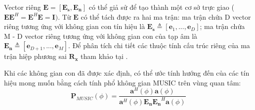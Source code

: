 Vector riêng $\mathbf{E} = [\mathbf{E}_{\mathbf{s}}, \mathbf{E}_{\mathbf{n}}]$ có thể giả sử để tạo thành một cơ sở trực giao ($\mathbf{E}\mathbf{E}^{H} = \mathbf{E}^{H}\mathbf{E} = \mathbf{I})$. Từ $\mathbf{E}$ có thể tách được ra hai ma trận: ma trận chứa D vector riêng tương ứng với không gian con tín hiệu là $\mathbf{E}_{\mathbf{s}} \triangleq [\mathbf{e}_{1}, ..., \mathbf{e}_{D}]$; ma trận chứa M - D vector riêng tương ứng với không gian con của tạp âm là $\mathbf{E}_{\mathbf{n}} \triangleq [\mathbf{e}_{D+1}, ..., \mathbf{e}_{M}]$. Để phân tích chi tiết các thuộc tính cấu trúc riêng của ma trận hiệp phương sai $\mathbf{R}_{\mathbf{x}}$ tham khảo tại \cite{Schmidt2009a}.


Khi các không gian con đã được xác định, có thể ước tính hướng đến của các tín hiệu mong muốn bằng cách tính phổ không gian MUSIC trên vùng quan tâm:
\begin{equation}
	\mathbf{P}_{MUSIC}(\phi) = \frac{\mathbf{a}^{H}(\phi)\mathbf{a}(\phi)}{\mathbf{a}^{H}(\phi)\mathbf{E}_{\mathbf{n}}{\mathbf{E}_{\mathbf{n}}}^{H}\mathbf{a}({\phi})}
\end{equation}

